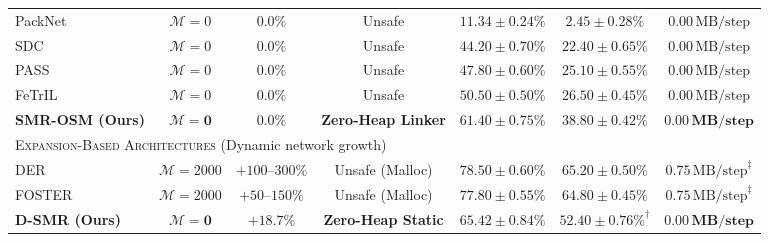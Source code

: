 \documentclass{article}
\begin{document}
\begin{table}[!t]
{\begin{tabular}{lcccccc}
PackNet~\cite{mallya2018packnet} & $\mathcal{M}=0$ & $0.0\%$ & Unsafe & $11.34 \pm 0.24\%$ & $2.45 \pm 0.28\%$ & $0.00\,\text{MB/step}$ \\
SDC~\cite{yu2020sdc} & $\mathcal{M}=0$ & $0.0\%$ & Unsafe & $44.20 \pm 0.70\%$ & $22.40 \pm 0.65\%$ & $0.00\,\text{MB/step}$ \\
PASS~\cite{zhu2021pass} & $\mathcal{M}=0$ & $0.0\%$ & Unsafe & $47.80 \pm 0.60\%$ & $25.10 \pm 0.55\%$ & $0.00\,\text{MB/step}$ \\
FeTrIL~\cite{petit2023fetril} & $\mathcal{M}=0$ & $0.0\%$ & Unsafe & $50.50 \pm 0.50\%$ & $26.50 \pm 0.45\%$ & $0.00\,\text{MB/step}$ \\
\textbf{SMR-OSM (Ours)} & $\mathbf{\mathcal{M}=0}$ & $\mathbf{0.0\%}$ & \textbf{Zero-Heap Linker} & $\mathbf{61.40 \pm 0.75\%}$ & $\mathbf{38.80 \pm 0.42\%}$ & $\mathbf{0.00\,\text{MB/step}}$ \\
\midrule
\multicolumn{7}{l}{\textsc{Expansion-Based Architectures} (Dynamic network growth)} \\
\midrule
DER~\cite{yan2021der} & $\mathcal{M}=2000$ & $+100\text{--}300\%$ & Unsafe (Malloc) & $78.50 \pm 0.60\%$ & $65.20 \pm 0.50\%$ & $0.75\,\text{MB/step}^\ddagger$ \\
FOSTER~\cite{wang2022foster} & $\mathcal{M}=2000$ & $+50\text{--}150\%$ & Unsafe (Malloc) & $77.80 \pm 0.55\%$ & $64.80 \pm 0.45\%$ & $0.75\,\text{MB/step}^\ddagger$ \\
\textbf{D-SMR (Ours)} & $\mathbf{\mathcal{M}=0}$ & $\mathbf{+18.7\%}$ & \textbf{Zero-Heap Static} & $\mathbf{65.42 \pm 0.84\%}$ & $\mathbf{52.40 \pm 0.76\%^\dagger}$ & $\mathbf{0.00\,\text{MB/step}}$ \\
\bottomrule
\end{tabular}%
}
\vskip 2pt
\end{table}
\vspace{-2mm}
\end{document}
